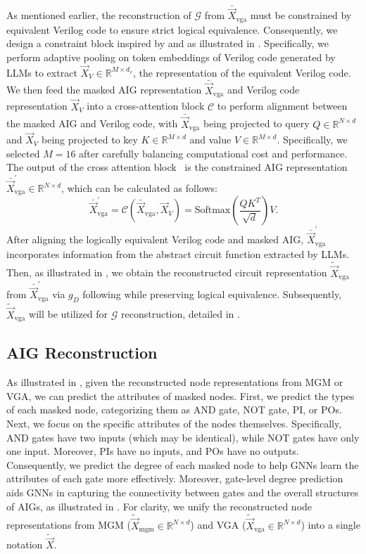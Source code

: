 As mentioned earlier, the reconstruction of $\mathcal{G}$ from $\bar{\Vec{X}}_\text{vga}$ must be constrained by equivalent Verilog code to ensure strict logical equivalence. 
Consequently, we design a constraint block inspired by \cite{jaegle2021perceiver} and \cite{lee2024nvembed} as illustrated in .
Specifically, we perform adaptive pooling on token embeddings of Verilog code generated by LLMs to extract $\Vec{X}_V \in \mathbb{R}^{M \times d_{v}}$, the representation of the equivalent Verilog code. 
We then feed the masked AIG representation $\bar{\Vec{X}}_\text{vga}$ and Verilog code representation $\Vec{X}_V$ into a cross-attention block $\mathcal{C}$ to perform alignment between the masked AIG and Verilog code, with $\bar{\Vec{X}}_\text{vga}$ being projected to query $Q \in \mathbb{R}^{N \times d}$ and $\Vec{X}_V$ being projected to key $K \in \mathbb{R}^{M \times d}$ and value $V \in \mathbb{R}^{M \times d}$. 
Specifically, we selected $M = 16$ after carefully balancing computational cost and performance.
The output of the cross attention block~\citep{vaswani2017attention} is the constrained AIG representation $\bar{\Vec{X}}^{\prime}_\text{vga} \in \mathbb{R}^{N\times d}$, which can be calculated as follows:
\begin{equation}
\bar{\Vec{X}}^{\prime}_\text{vga} = \mathcal{C}(\bar{\Vec{X}}_\text{vga}, \Vec{X}_V) = \text{Softmax}\left(\frac{Q K^T}{\sqrt{d}}\right) V.
\end{equation}
After aligning the logically equivalent Verilog code and masked AIG, $\bar{\Vec{X}}^{\prime}_\text{vga}$ incorporates information from the abstract circuit function extracted by LLMs. 	
Then, as illustrated in , we obtain the reconstructed circuit representation $\tilde{\Vec{X}}_\text{vga}$ from $\bar{\Vec{X}}^{\prime}_\text{vga}$ via $g_D$ following  while preserving logical equivalence. 
Subsequently, $\tilde{\Vec{X}}_\text{vga}$ will be utilized for $\mathcal{G}$ reconstruction, detailed in .

\subsection{AIG Reconstruction}
\label{sec:AIG_rec}

As illustrated in , given the reconstructed node representations from MGM or VGA, we can predict the attributes of masked nodes.
First, we predict the types of each masked node, categorizing them as AND gate, NOT gate, PI, or POs.
Next, we focus on the specific attributes of the nodes themselves. 
Specifically, AND gates have two inputs (which may be identical), while NOT gates have only one input. 
Moreover, PIs have no inputs, and POs have no outputs. 
Consequently, we predict the degree of each masked node to help GNNs learn the attributes of each gate more effectively. 
Moreover, gate-level degree prediction aids GNNs in capturing the connectivity between gates and the overall structures of AIGs, as illustrated in . 
For clarity, we unify the reconstructed node representations from MGM ($\tilde{\Vec{X}}_{\text{mgm}} \in \mathbb{R}^{N \times d}$) and VGA ($\tilde{\Vec{X}}_{\text{vga}} \in \mathbb{R}^{N \times d}$) into a single notation $\tilde{\Vec{X}}$.


